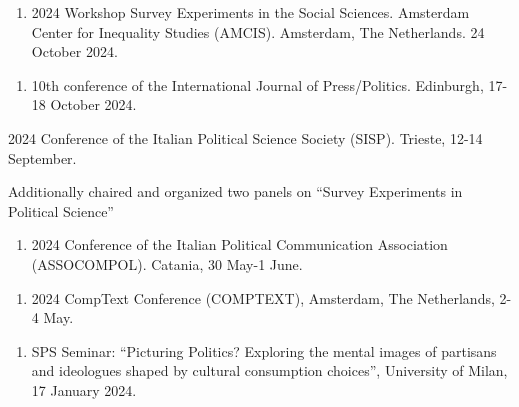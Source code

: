 \documentclass[10pt,]{article}
\providecommand{\tightlist}{%
  \setlength{\itemsep}{0pt}\setlength{\parskip}{0pt}}
\renewenvironment{itemize}{
  \begin{list}{}{
    \setlength{\leftmargin}{1.5em}
  }
}{
  \end{list}
}
\begin{document}
\begin{enumerate}
\def\labelenumi{\arabic{enumi}.}
\setcounter{enumi}{8}
\tightlist
\item
  2024 Workshop Survey Experiments in the Social Sciences. Amsterdam
  Center for Inequality Studies (AMCIS). Amsterdam, The Netherlands. 24
  October 2024.
\end{enumerate}

\begin{enumerate}
\def\labelenumi{\arabic{enumi}.}
\setcounter{enumi}{7}
\tightlist
\item
  10th conference of the International Journal of Press/Politics.
  Edinburgh, 17-18 October 2024.
\end{enumerate}

\begin{enumerate}
\def\labelenumi{\arabic{enumi}.}
\setcounter{enumi}{6}
\tightlist
\item
  2024 Conference of the Italian Political Science Society (SISP).
  Trieste, 12-14 September.

  \begin{itemize}
  \tightlist
  \item
    Additionally chaired and organized two panels on ``Survey
    Experiments in Political Science''
  \end{itemize}
\end{enumerate}

\begin{enumerate}
\def\labelenumi{\arabic{enumi}.}
\setcounter{enumi}{5}
\tightlist
\item
  2024 Conference of the Italian Political Communication Association
  (ASSOCOMPOL). Catania, 30 May-1 June.
\end{enumerate}

\begin{enumerate}
\def\labelenumi{\arabic{enumi}.}
\setcounter{enumi}{4}
\tightlist
\item
  2024 CompText Conference (COMPTEXT), Amsterdam, The Netherlands, 2-4
  May.
\end{enumerate}

\begin{enumerate}
\def\labelenumi{\arabic{enumi}.}
\setcounter{enumi}{3}
\tightlist
\item
  SPS Seminar: ``Picturing Politics? Exploring the mental images of
  partisans and ideologues shaped by cultural consumption choices'',
  University of Milan, 17 January 2024.
\end{enumerate}
\end{document}
